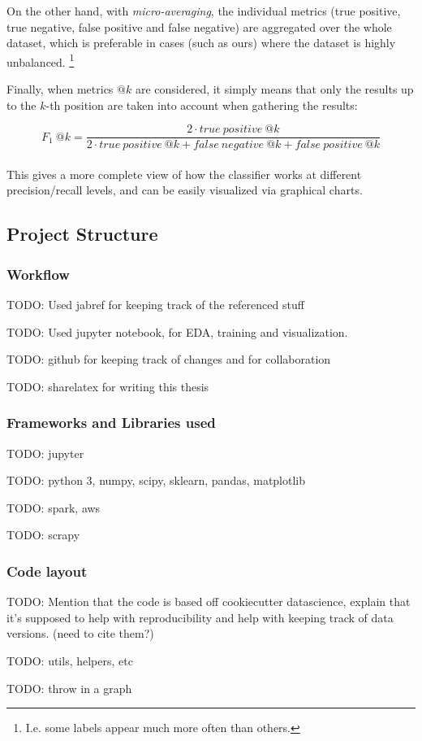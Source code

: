 On the other hand, with \textit{micro-averaging}, the individual metrics (true positive, true negative, false positive and false negative) are aggregated over the whole dataset, which is preferable in cases (such as ours) where the dataset is highly unbalanced. \footnote{I.e. some labels appear much more often than others.}  

Finally, when metrics $@k$ are considered, it simply means that only the results up to the $k$-th position are taken into account when gathering the results:

\begin{equation}
F_1\ @k = \frac{2 \cdot true \ positive\ @k}{2 \cdot true \ positive\ @k + false \ negative\ @k + false \ positive\ @k} 
\end{equation}\\

This gives a more complete view of how the classifier works at different precision/recall levels, and can be easily visualized via graphical charts.

\subsection{Project Structure}

\subsubsection{Workflow}

{\color{red} TODO: Used jabref for keeping track of the referenced stuff}

{\color{red} TODO: Used jupyter notebook, for EDA, training and visualization.}

{\color{red} TODO: github for keeping track of changes and for collaboration}

{\color{red} TODO: sharelatex for writing this thesis}

\subsubsection{Frameworks and Libraries used}

{\color{red} TODO: jupyter}

{\color{red} TODO: python 3, numpy, scipy, sklearn, pandas, matplotlib}

{\color{red} TODO: spark, aws}

{\color{red} TODO: scrapy}

\subsubsection{Code layout}

{\color{red} TODO: Mention that the code is based off cookiecutter datascience, explain that it's supposed to help with reproducibility and help with keeping track of data versions. (need to cite them?)}

{\color{red} TODO: utils, helpers, etc}

{\color{red} TODO: throw in a graph }